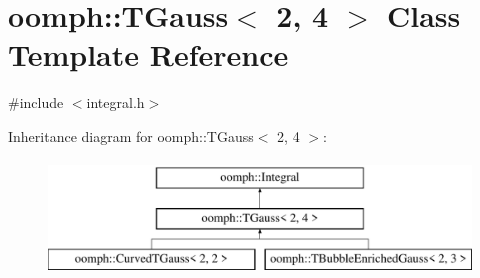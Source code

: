 \hypertarget{classoomph_1_1TGauss_3_012_00_014_01_4}{}\section{oomph\+:\+:T\+Gauss$<$ 2, 4 $>$ Class Template Reference}
\label{classoomph_1_1TGauss_3_012_00_014_01_4}


{\ttfamily \#include $<$integral.\+h$>$}

Inheritance diagram for oomph\+:\+:T\+Gauss$<$ 2, 4 $>$\+:\begin{figure}[H]
\begin{center}
\leavevmode
\includegraphics[height=3.000000cm]{classoomph_1_1TGauss_3_012_00_014_01_4}
\end{center}
\end{figure}
